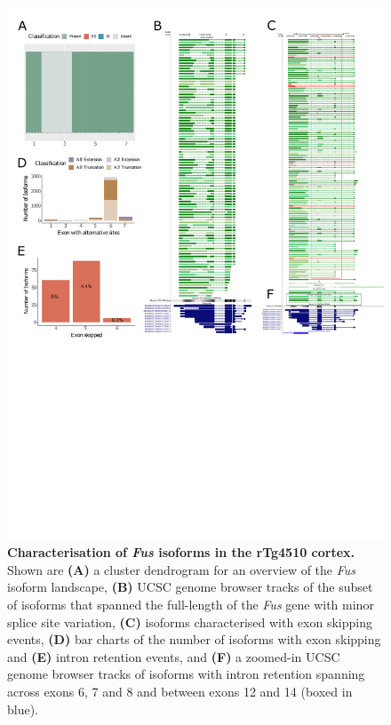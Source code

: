 \begin{figure}[htp]
	\centering
	\includegraphics[page=4,trim={0 4cm 0 0},scale = 0.85]{Figures/TargetGenes_Annotation_Portrait.pdf}
	\captionsetup{width=0.95\textwidth}
	\caption[Characterisation of the \textit{Fus} isoform landscape]%
	{\textbf{Characterisation of \textit{Fus} isoforms in the rTg4510 cortex.} Shown are \textbf{(A)} a cluster dendrogram for an overview of the \textit{Fus} isoform landscape, \textbf{(B)} UCSC genome browser tracks of the subset of isoforms that spanned the full-length of the \textit{Fus} gene with minor splice site variation, \textbf{(C)} isoforms characterised with exon skipping events, \textbf{(D)} bar charts of the number of isoforms with exon skipping and \textbf{(E)} intron retention events, and \textbf{(F)} a zoomed-in UCSC genome browser tracks of isoforms with intron retention spanning across exons 6, 7 and 8 and between exons 12 and 14 (boxed in blue).}    
	\label{fig:fus}
\end{figure}
\restoregeometry


